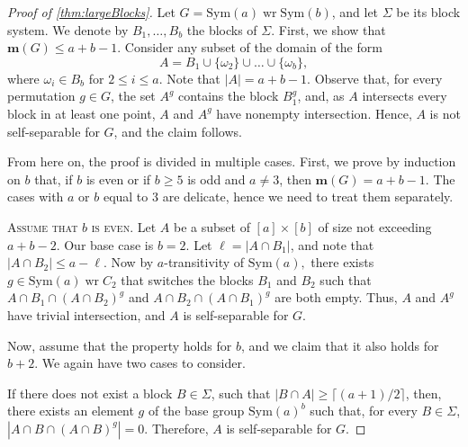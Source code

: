 \documentclass[a4paper]{amsart}
\newcommand{\Sym}{\mathrm{Sym}}
\renewcommand{\wr}{\mathop{\mathrm{wr}}}
\newcommand{\m}{\mathbf{m}}
\theoremstyle{definition}
\begin{document}
\begin{proof}[Proof of \cref{thm:largeBlocks}]
    Let $G= \Sym(a)\wr \Sym(b)$, and let $\Sigma$ be its block system. We denote by $B_1,\dots, B_b$ the blocks of $\Sigma$. First, we show that $\m(G) \le a + b -1$. Consider any subset of the domain of the form
    \[A = B_1 \cup \{\omega_2\} \cup \dots \cup \{\omega_b\},\]
    where $\omega_i\in B_b$ for $2\leq i \leq a$. Note that $|A| = a + b -1$. Observe that, for every permutation $g \in G$, the set $A^g$ contains the block $B_1^g$, and, as $A$ intersects every block in at least one point, $A$ and $A^g$ have nonempty intersection. Hence, $A$ is not self-separable for $G$, and the claim follows.

    From here on, the proof is divided in multiple cases. First, we prove by induction on $b$ that, if $b$ is even or if $b\ge 5$ is odd and $a \neq 3$, then $\m(G) = a + b -1$. The cases with $a$ or $b$ equal to $3$ are delicate, hence we need to treat them separately.

    \smallskip
    \noindent \textsc{Assume that $b$ is even.}  Let $A$ be a subset of $[a]\times[b]$ of size not exceeding $a+b-2$. Our base case is $b=2$. Let $\ell = |A \cap B_1|$, and note that $|A \cap B_2| \leq a-\ell$. Now by $a$-transitivity of $\Sym(a),$ there exists $g \in \Sym(a) \wr C_2$ that switches the blocks $B_1$ and $B_2$ such that $A \cap B_1 \cap (A \cap B_2)^g$ and $A \cap B_2 \cap (A \cap B_1)^g$ are both empty. Thus, $A$ and $A^g$ have trivial intersection, and $A$ is self-separable for $G$.

    Now, assume that the property holds for $b$, and we claim that it also holds for $b + 2$. We again have two cases to consider. 
    
    If there does not exist a block $B \in \Sigma$, such that $|B \cap A| \ge \lceil (a+1) /2 \rceil$, then, there exists an element $g$ of the base group $\Sym(a)^b$ such that, for every $B\in \Sigma$, $|A\cap B \cap (A\cap B)^g| = 0$. Therefore, $A$ is self-separable for $G$.
    

\end{proof}
\end{document}
